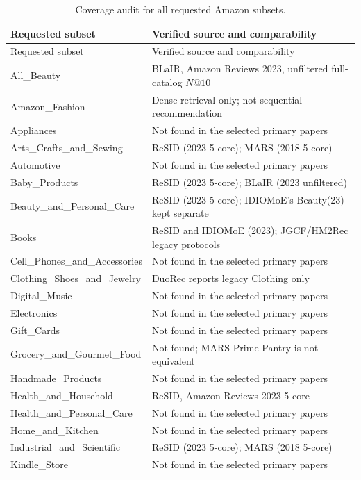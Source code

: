 \begin{longtable}{@{}p{}p{}@{}}
\caption{Coverage audit for all requested Amazon subsets.}
\label{tab:amazon-coverage}\\
\toprule
Requested subset & Verified source and comparability \\
\midrule
\endfirsthead
\toprule
Requested subset & Verified source and comparability \\
\midrule
\endhead
All\_Beauty & BLaIR, Amazon Reviews 2023, unfiltered full-catalog $N@10$ \\
Amazon\_Fashion & Dense retrieval only; not sequential recommendation \\
Appliances & Not found in the selected primary papers \\
Arts\_Crafts\_and\_Sewing & ReSID (2023 5-core); MARS (2018 5-core) \\
Automotive & Not found in the selected primary papers \\
Baby\_Products & ReSID (2023 5-core); BLaIR (2023 unfiltered) \\
Beauty\_and\_Personal\_Care & ReSID (2023 5-core); IDIOMoE's Beauty(23) kept separate \\
Books & ReSID and IDIOMoE (2023); JGCF/HM2Rec legacy protocols \\
Cell\_Phones\_and\_Accessories & Not found in the selected primary papers \\
Clothing\_Shoes\_and\_Jewelry & DuoRec reports legacy Clothing only \\
Digital\_Music & Not found in the selected primary papers \\
Electronics & Not found in the selected primary papers \\
Gift\_Cards & Not found in the selected primary papers \\
Grocery\_and\_Gourmet\_Food & Not found; MARS Prime Pantry is not equivalent \\
Handmade\_Products & Not found in the selected primary papers \\
Health\_and\_Household & ReSID, Amazon Reviews 2023 5-core \\
Health\_and\_Personal\_Care & Not found in the selected primary papers \\
Home\_and\_Kitchen & Not found in the selected primary papers \\
Industrial\_and\_Scientific & ReSID (2023 5-core); MARS (2018 5-core) \\
Kindle\_Store & Not found in the selected primary papers \\

\end{longtable}
